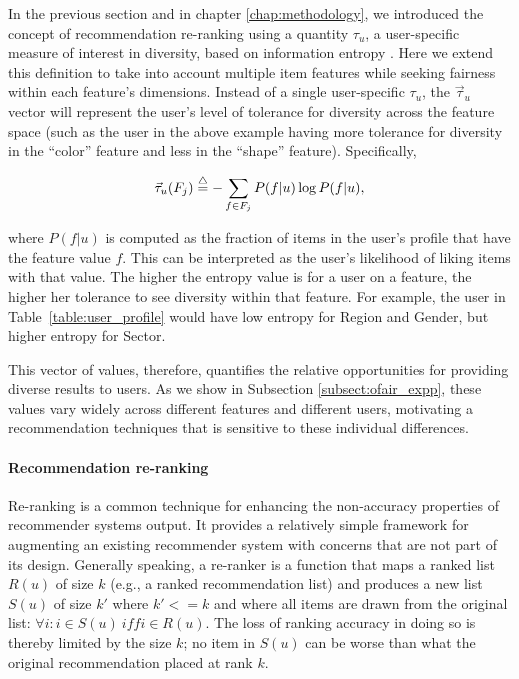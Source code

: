 In the previous section and in chapter \ref{chap:methodology}, we introduced the concept of recommendation re-ranking using a quantity $\tau_u$, a user-specific measure of interest in diversity, based on information entropy \cite{liu2018personalizing,liu2019personalized}. Here we extend this definition to take into account multiple item features while seeking fairness within each feature's dimensions. Instead of a single user-specific $\tau_u$, the $\vec{\tau}_u$ vector will represent the user's level of tolerance for diversity across the feature space (such as the user in the above example having more tolerance for diversity in the ``color'' feature and less in the ``shape'' feature). Specifically,

\begin{equation}
\vec{\tau}_u(F_{j})\buildrel\triangle\over=-\sum_{f \in F_j} P(f|u)\log P(f|u),
\label{eq:tau}
\end{equation}

where $P(f|u)$ is computed as the fraction of items in the user's profile that have the feature value $f$. This can be interpreted as the user's likelihood of liking items with that value. The higher the entropy value is for a user on a feature, the higher her tolerance to see diversity within that feature. For example, the user in Table~\ref{table:user_profile} would have low entropy for Region and Gender, but higher entropy for Sector.

This vector of values, therefore, quantifies the relative opportunities for providing diverse results to users. As we show in Subsection \ref{subsect:ofair_expp}, these values vary widely across different features and different users, motivating a recommendation techniques that is sensitive to these individual differences. 

\noindent\paragraph{\textbf{Recommendation re-ranking}}
\newline
\indent Re-ranking is a common technique for enhancing the non-accuracy properties of recommender systems output. It provides a relatively simple framework for augmenting an existing recommender system with concerns that are not part of its design. Generally speaking, a re-ranker is a function that maps a ranked list $R(u)$ of size $k$ (e.g., a ranked recommendation list) and produces a new list $S(u)$ of size $k'$ where $k'<= k$ and where all items are drawn from the original list: $\forall{i}: i \in S(u) ~\mathit{iff} i\in R(u)$. The loss of ranking accuracy in doing so is thereby limited by the size $k$; no item in $S(u)$ can be worse than what the original recommendation placed at rank $k$. 

